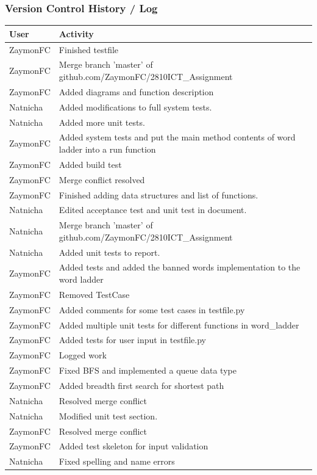 \documentclass[12pt, a4]{report}
\begin{document}
		\subsubsection{Version Control History / Log}
		\begin{tabular}{ | p{2cm} | p{13cm} | }
			\hline
				User & Activity \\
			\hline
			ZaymonFC & Finished testfile \\ 
			ZaymonFC & Merge branch 'master' of github.com/ZaymonFC/2810ICT\_Assignment \\ 
			ZaymonFC & Added diagrams and function description \\ 
			Natnicha & Added modifications to full system tests. \\ 
			Natnicha & Added more unit tests. \\ 
			ZaymonFC & Added system tests and put the main method contents of word ladder into a run function \\ 
			ZaymonFC & Added build test \\ 
			ZaymonFC & Merge conflict resolved \\ 
			ZaymonFC & Finished adding data structures and list of functions. \\ 
			Natnicha & Edited acceptance test and unit test in document. \\ 
			Natnicha & Merge branch 'master' of github.com/ZaymonFC/2810ICT\_Assignment \\ 
			Natnicha & Added unit tests to report. \\ 
			ZaymonFC & Added tests and added the banned words implementation to the word ladder \\ 
			ZaymonFC & Removed TestCase \\ 
			ZaymonFC & Added comments for some test cases in testfile.py \\ 
			ZaymonFC & Added multiple unit tests for different functions in word\_ladder \\ 
			ZaymonFC & Added tests for user input in testfile.py \\ 
			ZaymonFC & Logged work \\ 
			ZaymonFC & Fixed BFS and implemented a queue data type \\ 
			ZaymonFC & Added breadth first search for shortest path \\ 
			Natnicha & Resolved merge conflict \\ 
			Natnicha & Modified unit test section. \\ 
			ZaymonFC & Resolved merge conflict \\ 
			ZaymonFC & Added test skeleton for input validation \\ 
			Natnicha & Fixed spelling and name errors \\ 
				\hline 
			\end{tabular}
			
\end{document}
